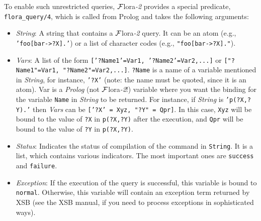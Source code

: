 \documentclass[11pt]{article}
\newcommand{\FLSYSTEM}{{\mbox{\sc ${\cal F}${lora}\rm\emph{-2}}}\xspace}
\begin{document}
To enable such unrestricted queries, \FLSYSTEM provides a special predicate,
{\tt flora\_query/4}, which is called from Prolog
and takes the following arguments: 
\begin{itemize}
  \item  \emph{String}: A string that contains a \FLSYSTEM query. It can be an
    atom (e.g., {\tt 'foo[bar->?X].'}) or a list of character codes (e.g.,
    {\tt "foo[bar->?X]."}).
  \item \emph{Vars}: A list of the form {\tt ['?Name1'=Var1,
      '?Name2'=Var2,...]} or
    {\tt ["?Name1"=Var1, "?Name2"=Var2,...]}.
    {\tt ?Name} is a name of a variable mentioned in \emph{String}, for
    instance, {\tt '?X'} (note: the name must be quoted, since it is an
    atom).  Var is a \emph{Prolog} (not \FLSYSTEM!)
    variable where you want the binding for the variable
    {\tt Name} in \emph{String} to be returned.  For instance, if
    \emph{String} is {\tt 'p(?X,?Y).'} then \emph{Vars} can be {\tt ['?X' =
      Xyz, "?Y" = Qpr]}. In this case, {\tt Xyz} will be bound to the value
    of {\tt ?X} in {\tt p(?X,?Y)} after the execution, and {\tt Qpr} will be
    bound to the value of {\tt ?Y} in {\tt p(?X,?Y)}.
  \item \emph{Status}: Indicates the status of compilation of the command
    in {\tt String}.  It is a list, which contains various indicators.
    The most important ones are {\tt success} and {\tt failure}.
  \item \emph{Exception}: If the execution of the query is successful, this
    variable is bound to {\tt normal}. Otherwise, this variable will
    contain an exception term returned by XSB (see the XSB manual, if you
    need to process exceptions in sophisticated ways).
\end{itemize}
\end{document}

